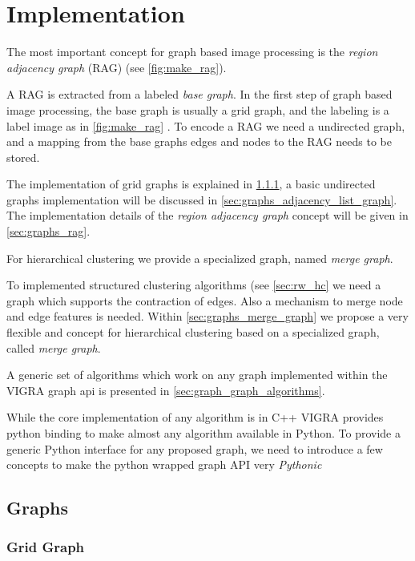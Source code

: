 

\section{Implementation}\label{sec:vigra_graph_lib_impl}


The most important concept for graph based image processing
is the \emph{region adjacency graph} (RAG) (see \cref{fig:make_rag}).

A RAG is extracted from a labeled \emph{base graph}.
In the first step of graph based image processing, the base 
graph is usually a grid graph, and the labeling is a label image
as in \cref{fig:make_rag} .
To encode a RAG we need a undirected graph, 
and a mapping from the base graphs edges and nodes to the RAG 
needs to be stored.

The implementation of grid graphs is explained in \cref{sec:graphs_grid_graph}, 
a basic undirected graphs implementation will be discussed in \cref{sec:graphs_adjacency_list_graph}.
The implementation details of the \emph{region adjacency graph} concept will 
be given in  \cref{sec:graphs_rag}.

For hierarchical clustering we provide a specialized graph, named \emph{merge graph}.


To implemented structured clustering algorithms (see \cref{sec:rw_hc} we
need a graph which supports the contraction of edges.
Also a mechanism to merge node and edge features is needed.
Within \cref{sec:graphs_merge_graph} we propose  a very flexible
and concept for hierarchical clustering based on a specialized graph,
called \emph{merge graph}.


A generic set of algorithms which work on any graph
implemented within the VIGRA graph api is presented 
in \cref{sec:graph_graph_algorithms}.

While the core implementation of any algorithm is in C++
VIGRA provides python binding to make almost
any algorithm available in Python.
To provide a generic Python interface for any proposed
graph, we need to introduce a few concepts 
to make the python wrapped graph API very \emph{Pythonic}


\subsection{Graphs}


\subsubsection{Grid Graph} \label{sec:graphs_grid_graph}

